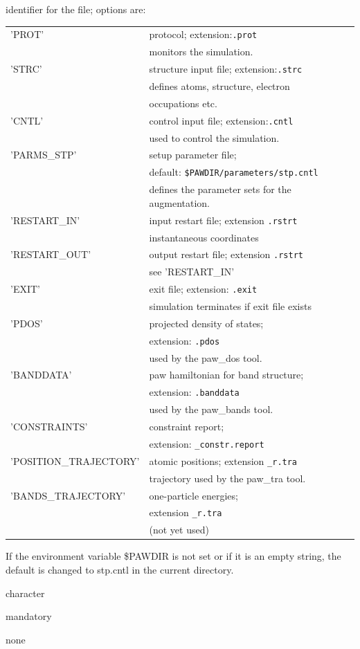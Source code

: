 \documentclass[final,12pt]{article}
\newcommand{\key}[1]{\hfill\break \makebox[1.5in][l]{\bf #1}\hfill\break}
\newcommand{\vdescr}[1]{\makebox[1in][l]{}\parbox[t]{110mm}{#1}\hfill\break}
\newcommand{\vformat}[1]{
\makebox[1in][l]{}\parbox[t]{110mm}{\makebox[1in][l]{Type:}\parbox[t]{2.7in}{#1}}
\hfill\break}
\newcommand{\vrules}[1]{
\makebox[1in][l]{}\parbox[t]{110mm}{\makebox[1in][l]{Rules:}\parbox[t]{2.7in}{#1}}
\hfill\break}
\newcommand{\vdefault}[1]{
\makebox[1in][l]{}\parbox[t]{110mm}
{\makebox[1in][l]{Default:}\parbox[t]{2.7in}{#1}}
\hfill\break}
\newcommand{\mbax}[1]{#1}
\begin{document}
\newpage
\mbax{\key{ID}
\vdescr{identifier for the file; options are:\hfill\break 
\noindent
\begin{tabular}{|l|l|}
\hline
'PROT'& protocol; extension:{\tt .prot}\\
&monitors the simulation.\\
\hline
'STRC'& structure input file; extension:{\tt .strc}\\
& defines atoms, structure, electron \\
&occupations etc.\\
\hline
'CNTL'& control input file; extension:{\tt .cntl}\\
&used to control the simulation.\\
\hline
'PARMS\_STP'& setup parameter file; \\
&default: {\tt \$PAWDIR/parameters/stp.cntl}\\
&defines the parameter sets for the augmentation.\\
\hline
'RESTART\_IN'& input restart file; extension {\tt .rstrt}\\
&instantaneous coordinates\\
\hline
'RESTART\_OUT'& output restart file; extension {\tt .rstrt}\\
&see 'RESTART\_IN'\\
\hline
'EXIT'& exit file; extension: {\tt .exit}\\
& simulation terminates if exit file exists\\
\hline
'PDOS'& projected density of states;\\
& extension: {\tt .pdos}\\
& used by the paw\_dos tool.\\
\hline
'BANDDATA'& paw hamiltonian for band structure;\\
& extension: {\tt .banddata}\\
& used by the paw\_bands tool.\\
\hline
'CONSTRAINTS'& constraint report;\\
& extension: {\tt \_constr.report}\\
\hline
'POSITION\_TRAJECTORY'& atomic positions; 
extension {\tt \_r.tra}\\
&trajectory used by the paw\_tra tool.\\
\hline
'BANDS\_TRAJECTORY'& one-particle energies;\\
&extension {\tt \_r.tra}\\
&(not yet used)\\
\hline
\end{tabular}
If the environment variable \$PAWDIR is not set or if it is an 
empty string, the default is changed to stp.cntl in the current directory.
}
\vformat{character} 
\vrules{mandatory}
\vdefault{none}}
\end{document}

